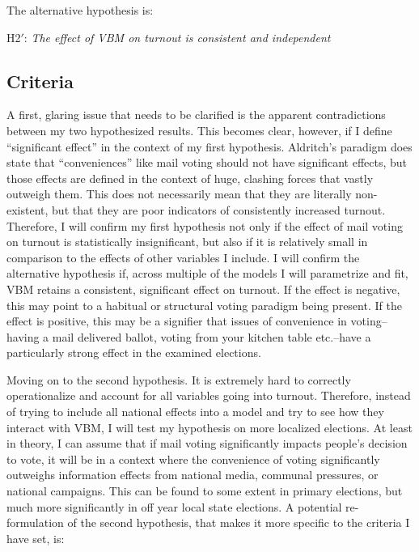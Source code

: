 \documentclass[12pt,twoside]{reedthesis}
\begin{document}
  The alternative hypothesis is:
  
  \begin{center}  
  H2$'$: \textit{The  effect  of  VBM  on  turnout  is  consistent  and  independent}
  \end{center}
  
  \subsection{Criteria}\label{criteria}
  
  A first, glaring issue that needs to be clarified is the apparent
  contradictions between my two hypothesized results. This becomes clear,
  however, if I define ``significant effect'' in the context of my first
  hypothesis. Aldritch's paradigm does state that ``conveniences'' like
  mail voting should not have significant effects, but those effects are
  defined in the context of huge, clashing forces that vastly outweigh
  them. This does not necessarily mean that they are literally
  non-existent, but that they are poor indicators of consistently
  increased turnout. Therefore, I will confirm my first hypothesis not
  only if the effect of mail voting on turnout is statistically
  insignificant, but also if it is relatively small in comparison to the
  effects of other variables I include. I will confirm the alternative
  hypothesis if, across multiple of the models I will parametrize and fit,
  VBM retains a consistent, significant effect on turnout. If the effect
  is negative, this may point to a habitual or structural voting paradigm
  being present. If the effect is positive, this may be a signifier that
  issues of convenience in voting--having a mail delivered ballot, voting
  from your kitchen table etc.--have a particularly strong effect in the
  examined elections.
  
  Moving on to the second hypothesis. It is extremely hard to correctly
  operationalize and account for all variables going into turnout.
  Therefore, instead of trying to include all national effects into a
  model and try to see how they interact with VBM, I will test my
  hypothesis on more localized elections. At least in theory, I can assume
  that if mail voting significantly impacts people's decision to vote, it
  will be in a context where the convenience of voting significantly
  outweighs information effects from national media, communal pressures,
  or national campaigns. This can be found to some extent in primary
  elections, but much more significantly in off year local state
  elections. A potential re-formulation of the second hypothesis, that
  makes it more specific to the criteria I have set, is:
  
\end{document}
